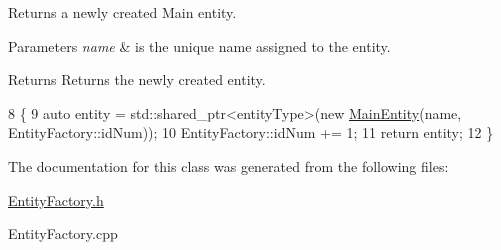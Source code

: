 Returns a newly created Main entity. 


\begin{DoxyParams}{Parameters}
{\em name} & is the unique name assigned to the entity.\\
\hline
\end{DoxyParams}
\begin{DoxyReturn}{Returns}
Returns the newly created entity. 
\end{DoxyReturn}

\begin{DoxyCode}
8                                                                         \{
9     \textcolor{keyword}{auto} entity = std::shared\_ptr<entityType>(\textcolor{keyword}{new} \hyperlink{class_main_entity}{MainEntity}(name, EntityFactory::idNum));
10     EntityFactory::idNum += 1;
11     \textcolor{keywordflow}{return} entity;
12 \}\end{DoxyCode}


The documentation for this class was generated from the following files\-:\begin{DoxyCompactItemize}
\item 
\hyperlink{_entity_factory_8h}{Entity\-Factory.\-h}\item 
Entity\-Factory.\-cpp\end{DoxyCompactItemize}
